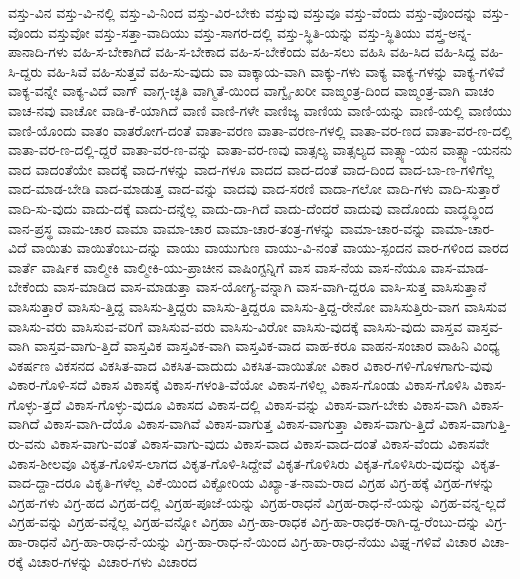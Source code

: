 {ವಸ್ತು-ವಿನ
ವಸ್ತು-ವಿ-ನಲ್ಲಿ
ವಸ್ತು-ವಿ-ನಿಂದ
ವಸ್ತು-ವಿರ-ಬೇಕು
ವಸ್ತುವು
ವಸ್ತುವೂ
ವಸ್ತು-ವೆಂದು
ವಸ್ತು-ವೊಂದನ್ನು
ವಸ್ತು-ವೊಂದು
ವಸ್ತುವೋ
ವಸ್ತು-ಸತ್ತಾ-ವಾದಿಯು
ವಸ್ತು-ಸಾಗರ-ದಲ್ಲಿ
ವಸ್ತು-ಸ್ಥಿತಿ-ಯನ್ನು
ವಸ್ತು-ಸ್ಥಿತಿಯು
ವಸ್ತ್ರ-ಅನ್ನ-ಪಾನಾದಿ-ಗಳು
ವಹಿ-ಸ-ಬೇಕಾಗಿದೆ
ವಹಿ-ಸ-ಬೇಕಾದ
ವಹಿ-ಸ-ಬೇಕೆಂದು
ವಹಿ-ಸಲು
ವಹಿಸಿ
ವಹಿ-ಸಿದ
ವಹಿ-ಸಿದ್ದ
ವಹಿ-ಸಿ-ದ್ದರು
ವಹಿ-ಸಿವೆ
ವಹಿ-ಸುತ್ತವೆ
ವಹಿ-ಸು-ವುದು
ವಾ
ವಾಕ್ಕಾಯ-ವಾಗಿ
ವಾಕ್ಕು-ಗಳು
ವಾಕ್ಯ
ವಾಕ್ಯ-ಗಳನ್ನು
ವಾಕ್ಯ-ಗಳಿವೆ
ವಾಕ್ಯ-ವನ್ನೇ
ವಾಕ್ಯ-ವಿದೆ
ವಾಗ್
ವಾಗ್ಗ-ಚ್ಛತಿ
ವಾಗ್ಮಿತೆ-ಯಿಂದ
ವಾಗ್ವೈ-ಖರೀ
ವಾಙ್ಮಂತ್ರ-ದಿಂದ
ವಾಙ್ಮಂತ್ರ-ವಾಗಿ
ವಾಚಂ
ವಾಚ-ನವು
ವಾಚೋ
ವಾಡಿ-ಕೆ-ಯಾಗಿದೆ
ವಾಣಿ
ವಾಣಿ-ಗಳೇ
ವಾಣಿಜ್ಯ
ವಾಣಿಯ
ವಾಣಿ-ಯನ್ನು
ವಾಣಿ-ಯಲ್ಲಿ
ವಾಣಿಯು
ವಾಣಿ-ಯೊಂದು
ವಾತಂ
ವಾತರೋಗ-ದಂತೆ
ವಾತಾ-ವರಣ
ವಾತಾ-ವರಣ-ಗಳಲ್ಲಿ
ವಾತಾ-ವರ-ಣದ
ವಾತಾ-ವರ-ಣ-ದಲ್ಲಿ
ವಾತಾ-ವರ-ಣ-ದಲ್ಲಿ-ದ್ದರೆ
ವಾತಾ-ವರ-ಣ-ವನ್ನು
ವಾತಾ-ವರ-ಣವು
ವಾತ್ಸಲ್ಯ
ವಾತ್ಸಲ್ಯದ
ವಾತ್ಸ್ಯಾ-ಯನ
ವಾತ್ಸ್ಯಾ-ಯನನು
ವಾದ
ವಾದಂತೆಯೇ
ವಾದಕ್ಕೆ
ವಾದ-ಗಳನ್ನು
ವಾದ-ಗಳೂ
ವಾದದ
ವಾದ-ದಂತೆ
ವಾದ-ದಿಂದ
ವಾದ-ಬಾ-ಣ-ಗಳಿಗೆಲ್ಲ
ವಾದ-ಮಾಡ-ಬೇಡಿ
ವಾದ-ಮಾಡುತ್ತ
ವಾದ-ವನ್ನು
ವಾದವು
ವಾದ-ಸರಣಿ
ವಾದಾ-ಗಲೋ
ವಾದಿ-ಗಳು
ವಾದಿ-ಸುತ್ತಾರೆ
ವಾದಿ-ಸು-ವುದು
ವಾದು-ದಕ್ಕೆ
ವಾದು-ದನ್ನೆಲ್ಲ
ವಾದು-ದಾ-ಗಿದೆ
ವಾದು-ದೆಂದರೆ
ವಾದುವು
ವಾದೊಂದು
ವಾದ್ಧದ್ಧಿಂದ
ವಾನ-ಪ್ರಸ್ಥ
ವಾಮ-ಚಾರ
ವಾಮಾ
ವಾಮಾ-ಚಾರ
ವಾಮಾ-ಚಾರ-ತಂತ್ರ-ಗಳನ್ನು
ವಾಮಾ-ಚಾರ-ವನ್ನು
ವಾಮಾ-ಚಾರ-ವಿದೆ
ವಾಯಿತು
ವಾಯಿತೆಂಬು-ದನ್ನು
ವಾಯು
ವಾಯುಗುಣ
ವಾಯು-ವಿ-ನಂತೆ
ವಾಯು-ಸ್ಪಂದನ
ವಾರ-ಗಳಿಂದ
ವಾರದ
ವಾರ್ತೆ
ವಾರ್ಷಿಕ
ವಾಲ್ಮೀಕಿ
ವಾಲ್ಮೀಕಿ-ಯು-ಪ್ರಾಚೀನ
ವಾಷಿಂಗ್ಟನ್ನಿಗೆ
ವಾಸ
ವಾಸ-ನೆಯ
ವಾಸ-ನೆಯೂ
ವಾಸ-ಮಾಡ-ಬೇಕೆಂದು
ವಾಸ-ಮಾಡಿದ
ವಾಸ-ಮಾಡುತ್ತಾ
ವಾಸ-ಯೋಗ್ಯ-ವನ್ನಾಗಿ
ವಾಸ-ವಾಗಿ-ದ್ದರೂ
ವಾಸಿ-ಸುತ್ತ
ವಾಸಿಸುತ್ತಾನೆ
ವಾಸಿಸುತ್ತಾರೆ
ವಾಸಿಸು-ತ್ತಿದ್ದ
ವಾಸಿಸು-ತ್ತಿದ್ದರು
ವಾಸಿಸು-ತ್ತಿದ್ದರೂ
ವಾಸಿಸು-ತ್ತಿದ್ದ-ರೇನೋ
ವಾಸಿಸುತ್ತಿರು-ವಾಗ
ವಾಸಿಸುವ
ವಾಸಿಸು-ವರು
ವಾಸಿಸುವ-ವರಿಗೆ
ವಾಸಿಸುವ-ವರು
ವಾಸಿಸು-ವಿರೋ
ವಾಸಿಸು-ವುದಕ್ಕೆ
ವಾಸಿಸು-ವುದು
ವಾಸ್ತವ
ವಾಸ್ತವ-ವಾಗಿ
ವಾಸ್ತವ-ವಾಗು-ತ್ತಿದೆ
ವಾಸ್ತವಿಕ
ವಾಸ್ತವಿಕ-ವಾಗಿ
ವಾಸ್ತವಿಕ-ವಾದ
ವಾಹ-ಕರೂ
ವಾಹನ-ಸಂಚಾರ
ವಾಹಿನಿ
ವಿಂಧ್ಯ
ವಿಕರ್ಷಣ
ವಿಕಸನದ
ವಿಕಸಿತ-ವಾದ
ವಿಕಸಿತ-ವಾದುದು
ವಿಕಸಿತ-ವಾಯಿತೋ
ವಿಕಾರ
ವಿಕಾರ-ಗಳಿ-ಗೊಳಗಾಗು-ವುವು
ವಿಕಾರ-ಗೊಳಿ-ಸದೆ
ವಿಕಾಸ
ವಿಕಾಸಕ್ಕೆ
ವಿಕಾಸ-ಗಳಂತಿ-ವೆಯೋ
ವಿಕಾಸ-ಗಳಿಲ್ಲ
ವಿಕಾಸ-ಗೊಂಡು
ವಿಕಾಸ-ಗೊಳಿಸಿ
ವಿಕಾಸ-ಗೊಳ್ಳು-ತ್ತದೆ
ವಿಕಾಸ-ಗೊಳ್ಳು-ವುದೂ
ವಿಕಾಸದ
ವಿಕಾಸ-ದಲ್ಲಿ
ವಿಕಾಸ-ವನ್ನು
ವಿಕಾಸ-ವಾಗ-ಬೇಕು
ವಿಕಾಸ-ವಾಗಿ
ವಿಕಾಸ-ವಾಗಿದೆ
ವಿಕಾಸ-ವಾಗಿ-ದೆಯೊ
ವಿಕಾಸ-ವಾಗಿವೆ
ವಿಕಾಸ-ವಾಗುತ್ತ
ವಿಕಾಸ-ವಾಗುತ್ತಾ
ವಿಕಾಸ-ವಾಗು-ತ್ತಿದೆ
ವಿಕಾಸ-ವಾಗುತ್ತಿ-ರು-ವನು
ವಿಕಾಸ-ವಾಗು-ವಂತೆ
ವಿಕಾಸ-ವಾಗು-ವುದು
ವಿಕಾಸ-ವಾದ
ವಿಕಾಸ-ವಾದ-ದಂತೆ
ವಿಕಾಸ-ವೆಂದು
ವಿಕಾಸವೇ
ವಿಕಾಸ-ಶೀಲವೂ
ವಿಕೃತ-ಗೊಳಿಸ-ಲಾಗದ
ವಿಕೃತ-ಗೊಳಿ-ಸಿದ್ದೇವೆ
ವಿಕೃತ-ಗೊಳಿಸಿರು
ವಿಕೃತ-ಗೊಳಿಸಿರು-ವುದನ್ನು
ವಿಕೃತ-ವಾದ-ದ್ದಾ-ದರೂ
ವಿಕೃತಿ-ಗಳೆಲ್ಲ
ವಿಕೆ-ಯಿಂದ
ವಿಕ್ಟೋರಿಯ
ವಿಖ್ಯಾ-ತ-ನಾಮ-ರಾದ
ವಿಗ್ರಹ
ವಿಗ್ರ-ಹಕ್ಕೆ
ವಿಗ್ರಹ-ಗಳನ್ನು
ವಿಗ್ರಹ-ಗಳು
ವಿಗ್ರ-ಹದ
ವಿಗ್ರಹ-ದಲ್ಲಿ
ವಿಗ್ರಹ-ಪೂಜೆ-ಯನ್ನು
ವಿಗ್ರಹ-ರಾಧನೆ
ವಿಗ್ರಹ-ರಾಧ-ನೆ-ಯನ್ನು
ವಿಗ್ರಹ-ವನ್ನ-ಲ್ಲದೆ
ವಿಗ್ರಹ-ವನ್ನು
ವಿಗ್ರಹ-ವನ್ನೆಲ್ಲ
ವಿಗ್ರಹ-ವನ್ನೋ
ವಿಗ್ರಹಾ
ವಿಗ್ರ-ಹಾ-ರಾಧಕ
ವಿಗ್ರ-ಹಾ-ರಾಧಕ-ರಾಗಿ-ದ್ದ-ರೆಂಬು-ದನ್ನು
ವಿಗ್ರ-ಹಾ-ರಾಧನೆ
ವಿಗ್ರ-ಹಾ-ರಾಧ-ನೆ-ಯನ್ನು
ವಿಗ್ರ-ಹಾ-ರಾಧ-ನೆ-ಯಿಂದ
ವಿಗ್ರ-ಹಾ-ರಾಧ-ನೆಯು
ವಿಘ್ನ-ಗಳಿವೆ
ವಿಚಾರ
ವಿಚಾ-ರಕ್ಕೆ
ವಿಚಾರ-ಗಳನ್ನು
ವಿಚಾರ-ಗಳು
ವಿಚಾರದ
}
